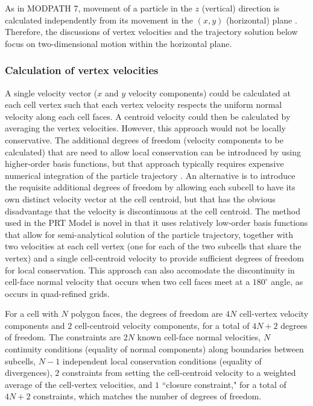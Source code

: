 As in MODPATH 7, movement of a particle in the $z$ (vertical) direction is calculated independently from its movement in the $(x, y)$ (horizontal) plane \citep{pollock2016modpath7} . Therefore, the discussions of vertex velocities and the trajectory solution below focus on two-dimensional motion within the horizontal plane.

\subsubsection{Calculation of vertex velocities}

A single velocity vector ($x$ and $y$ velocity components) could be calculated at each cell vertex such that each vertex velocity respects the uniform normal velocity along each cell faces. A centroid velocity could then be calculated by averaging the vertex velocities. However, this approach would not be locally conservative. The additional degrees of freedom (velocity components to be calculated) that are need to allow local conservation can be introduced by using higher-order basis functions, but that approach typically requires expensive numerical integration of the particle trajectory \citep{zhang2012}. An alternative is to introduce the requisite additional degrees of freedom by allowing each subcell to have its own distinct velocity vector at the cell centroid, but that has the obvious disadvantage that the velocity is discontinuous at the cell centroid. The method used in the PRT Model is novel in that it uses relatively low-order basis functions that allow for semi-analytical solution of the particle trajectory, together with two velocities at each cell vertex (one for each of the two subcells that share the vertex) and a single cell-centroid velocity to provide sufficient degrees of freedom for local conservation. This approach can also accomodate the discontinuity in cell-face normal velocity that occurs when two cell faces meet at a $180^\circ$ angle, as occurs in quad-refined grids.

For a cell with $N$ polygon faces, the degrees of freedom are $4N$ cell-vertex velocity components and $2$ cell-centroid velocity components, for a total of $4N + 2$ degrees of freedom. The constraints are $2N$ known cell-face normal velocities, $N$ continuity conditions (equality of normal components) along boundaries between subcells, $N - 1$ independent local conservation conditions (equality of divergences), $2$ constraints from setting the cell-centroid velocity to a weighted average of the cell-vertex velocities, and $1$ ``closure constraint," for a total of $4N + 2$ constraints, which matches the number of degrees of freedom.

